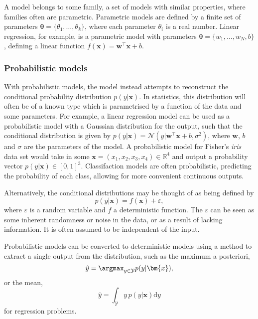 A model belongs to some family, a set of models with similar properties, where families often are parametric.
Parametric models are defined by a finite set of parameters $\bm{\theta}= \{\theta_1, \ldots, \theta_k\}$, where each parameter $\theta_i$ is a real number.
Linear regression, for example, is a parametric model with parameters $\bm{\theta} = \{w_1, \ldots, w_N, b\}$, defining a linear function $f(\bm{x}) = \bm{w}^\top\bm{x} + b$.

\subsubsection{Probabilistic models}
With probabilistic models, the model instead attempts to reconstruct the conditional probability distribution $p(y|\bm{x})$.
In statistics, this distribution will often be of a known type which is parametrised by a function of the data and some parameters.
For example, a linear regression model can be used as a probabilistic model with a Gaussian distribution for the output, such that the conditional distribution is given by $p(y|\bm{x}) = \mathcal{N}(y|\bm{w}^\top\bm{x} + b, \sigma^2)$, where $\bm{w}$, $b$ and $\sigma$ are the parameters of the model. A probabilistic model for Fisher's \textit{iris} data set would take in some $\bm{x}=(x_1,x_2,x_3,x_4)\in\mathbb{R}^4$ and output a probability vector $p(y|\bm{x})\in [0,1]^3$.
Classifaction models are often probabilistic, predicting the probability of each class, allowing for more convenient continuous outputs.

Alternatively, the conditional distributions may be thought of as being defined by
\begin{equation}
    p(y|\bm{x}) = f(\bm{x}) + \varepsilon,
    \label{eq:probabilistic_model}
\end{equation}
where $\varepsilon$ is a random variable and $f$ a deterministic function.
The $\varepsilon$ can be seen as some inherent randomness or noise in the data, or as a result of lacking information.
It is often assumed to be independent of the input.

Probabilistic models can be converted to deterministic models using a method to extract a single output from the distribution, such as the maximum a posteriori,
\begin{equation}
    \hat{y} = \argmax_{y\in\mathcal{Y}} p(y|\bm{x}),
\end{equation}
or the mean,
\begin{equation}
    \hat{y} = \int_{\mathcal{Y}} y \, p(y|\bm{x})\mathrm{d}y
\end{equation}
for regression problems.

